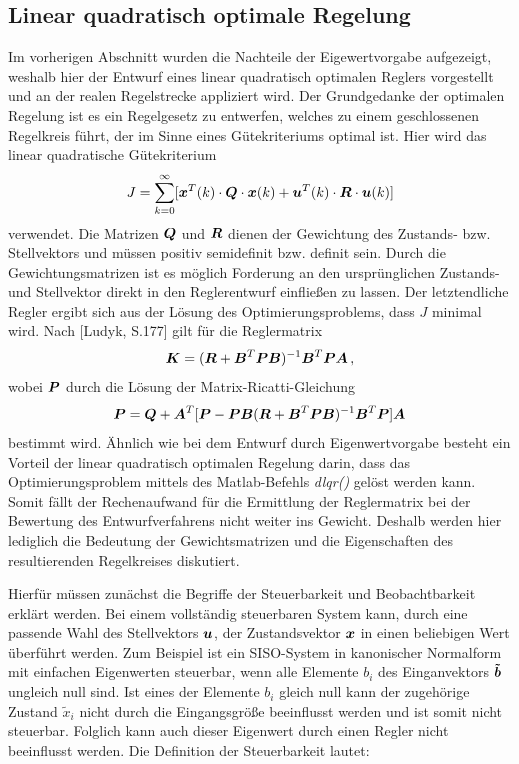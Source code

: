 \subsection{Linear quadratisch optimale Regelung}
Im vorherigen Abschnitt wurden die Nachteile der Eigewertvorgabe aufgezeigt, weshalb hier der Entwurf eines linear quadratisch optimalen Reglers vorgestellt und an der realen Regelstrecke appliziert wird. Der Grundgedanke der optimalen Regelung ist es ein Regelgesetz zu entwerfen, welches zu einem geschlossenen Regelkreis führt, der im Sinne eines Gütekriteriums optimal ist. Hier wird das linear quadratische Gütekriterium
\begin{equation}
J = \sum^{\infty}_{k=0} [\boldsymbol{x}^T(k)\cdot \boldsymbol{Q} \cdot \boldsymbol{x}(k) + \boldsymbol{u}^T(k)\cdot \boldsymbol{R}\cdot \boldsymbol{u}(k)]
\end{equation}
verwendet. Die Matrizen $\boldsymbol{Q}$ und $\boldsymbol{R}$ dienen der Gewichtung des Zustands- bzw. Stellvektors und müssen positiv semidefinit bzw. definit sein. Durch die Gewichtungsmatrizen ist es möglich Forderung an den ursprünglichen Zustands- und Stellvektor direkt in den Reglerentwurf einfließen zu lassen. Der letztendliche Regler ergibt sich aus der Lösung des Optimierungsproblems, dass $J$ minimal wird. Nach [Ludyk, S.177] gilt für die Reglermatrix
\begin{equation}
\boldsymbol{K} = (\boldsymbol{R}+\boldsymbol{B}^T\boldsymbol{P}\boldsymbol{B})^{-1}\boldsymbol{B}^T\boldsymbol{P}\boldsymbol{A}\,,
\end{equation}
wobei $\boldsymbol{P}$ durch die Lösung der Matrix-Ricatti-Gleichung 
\begin{equation}
\boldsymbol{P} = \boldsymbol{Q}+\boldsymbol{A}^T[\boldsymbol{P}-\boldsymbol{P}\boldsymbol{B}(\boldsymbol{R}+\boldsymbol{B}^T\boldsymbol{P}\boldsymbol{B})^{-1}\boldsymbol{B}^T\boldsymbol{P}]\boldsymbol{A}
\end{equation}
bestimmt wird. Ähnlich wie bei dem Entwurf durch Eigenwertvorgabe besteht ein Vorteil der linear quadratisch optimalen Regelung darin, dass das Optimierungsproblem mittels des Matlab-Befehls \textit{dlqr()} gelöst werden kann. Somit fällt der Rechenaufwand für die Ermittlung der Reglermatrix bei der Bewertung des Entwurfverfahrens nicht weiter ins Gewicht. Deshalb werden hier lediglich die Bedeutung der Gewichtsmatrizen und die Eigenschaften des resultierenden Regelkreises diskutiert.

Hierfür müssen zunächst die Begriffe der Steuerbarkeit und Beobachtbarkeit erklärt werden. Bei einem vollständig steuerbaren System kann, durch eine passende Wahl des Stellvektors $\boldsymbol{u}$, der Zustandsvektor $\boldsymbol{x}$ in einen beliebigen Wert überführt werden. Zum Beispiel ist ein SISO-System in kanonischer Normalform mit einfachen Eigenwerten steuerbar, wenn alle Elemente $b_{i}$ des Einganvektors $\boldsymbol{\tilde{b}}$ ungleich null sind. Ist eines der Elemente $b_{i}$ gleich null kann der zugehörige Zustand $\tilde{x}_i$ nicht durch die Eingangsgröße beeinflusst werden und ist somit nicht steuerbar. Folglich kann auch dieser Eigenwert durch einen Regler nicht beeinflusst werden. Die Definition der Steuerbarkeit lautet:

